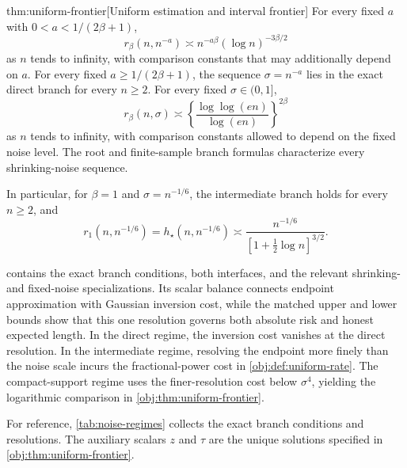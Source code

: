\documentclass[11pt]{article}
\begin{document}
\begin{theoremv}{thm:uniform-frontier}[Uniform estimation and interval frontier]
For every fixed \(a\) with \(0<a<1/(2\beta+1)\),
\[
r_\beta(n,n^{-a})
\asymp n^{-a\beta}(\log n)^{-3\beta/2}
\]
as \(n\) tends to infinity, with comparison constants that may additionally depend on \(a\). For every fixed \(a\ge1/(2\beta+1)\), the sequence \(\sigma=n^{-a}\) lies in the exact direct branch for every \(n\ge2\). For every fixed \(\sigma\in(0,1]\),
\[
r_\beta(n,\sigma)
\asymp
\left\{\frac{\log\log(en)}{\log(en)}\right\}^{2\beta}
\]
as \(n\) tends to infinity, with comparison constants allowed to depend on the fixed noise level. The root and finite-sample branch formulas characterize every shrinking-noise sequence.

In particular, for \(\beta=1\) and \(\sigma=n^{-1/6}\), the intermediate branch holds for every \(n\ge2\), and
\[
r_1(n,n^{-1/6})
=h_\star(n,n^{-1/6})
\asymp
\frac{n^{-1/6}}{[1+\tfrac12\log n]^{3/2}}.
\]
\end{theoremv}

 contains the exact branch conditions, both interfaces, and the relevant shrinking- and fixed-noise specializations. Its scalar balance connects endpoint approximation with Gaussian inversion cost, while the matched upper and lower bounds show that this one resolution governs both absolute risk and honest expected length. In the direct regime, the inversion cost vanishes at the direct resolution. In the intermediate regime, resolving the endpoint more finely than the noise scale incurs the fractional-power cost in \cref{obj:def:uniform-rate}. The compact-support regime uses the finer-resolution cost below \(\sigma^4\), yielding the logarithmic comparison in \cref{obj:thm:uniform-frontier}.

For reference, \cref{tab:noise-regimes} collects the exact branch conditions and resolutions. The auxiliary scalars \(z\) and \(\tau\) are the unique solutions specified in \cref{obj:thm:uniform-frontier}.
\end{document}
